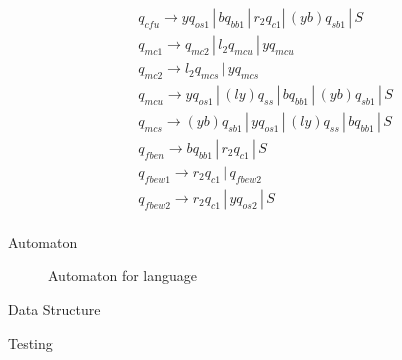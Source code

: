 \documentclass{article}
\begin{document}
\begin{mylist}
\begin{align*}
&q_{cfu} \rightarrow yq_{os1} \, | \,  bq_{bb1} \, | \, r_2q_{c1} | \, (yb)q_{sb1} \, | \, S\\ 
&q_{mc1} \rightarrow q_{mc2} \, | \, l_2q_{mcu} \, | \, yq_{mcu}\\
&q_{mc2} \rightarrow l_2q_{mcs} \, | \, yq_{mcs}\\
&q_{mcu} \rightarrow yq_{os1} \, | \, (ly)q_{ss} \, | \, bq_{bb1} \, | \, (yb)q_{sb1} \, | \, S\\
&q_{mcs} \rightarrow (yb)q_{sb1} \, | \, yq_{os1} \, | \, (ly)q_{ss} \, | \, bq_{bb1}\, | \, S\\
&q_{fben} \rightarrow bq_{bb1} \, | \, r_2q_{c1} \, | \, S\\
&q_{fbew1} \rightarrow r_2q_{c1} \, | \, q_{fbew2} \\
&q_{fbew2} \rightarrow r_2q_{c1} \, | \, yq_{os2} \, | \, S\\
\end{align*}

\item Automaton

\begin{center}

\begin{figure}[ht]
    \centering
    \caption{Automaton for language}
    \label{fig1:automaton-for-language}
\end{figure}

\end{center}

\newpage
\item Data Structure

\item Testing

\end{mylist}
\end{document}
